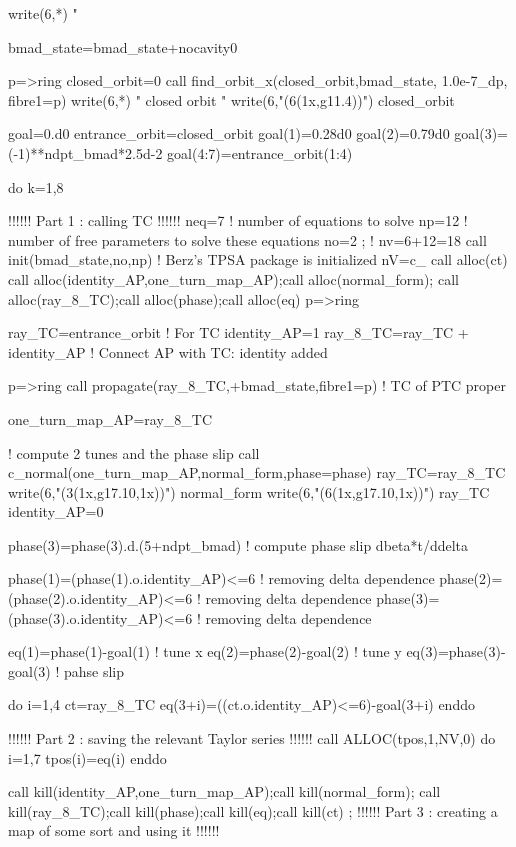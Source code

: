 \documentclass{hitec}     %
\begin{document}
{{\begin{code}
write(6,*) " %

bmad_state=bmad_state+nocavity0

p=>ring%
closed_orbit=0
call find_orbit_x(closed_orbit,bmad_state, 1.0e-7_dp, fibre1=p)
write(6,*) " closed orbit "
write(6,"(6(1x,g11.4))") closed_orbit
 
goal=0.d0
entrance_orbit=closed_orbit
goal(1)=0.28d0
goal(2)=0.79d0
goal(3)=(-1)**ndpt_bmad*2.5d-2
goal(4:7)=entrance_orbit(1:4)

do k=1,8

!!!!!! Part 1 : calling TC !!!!!!
neq=7     ! number of equations to solve
np=12     ! number of free parameters to solve these equations
no=2 ;    ! nv=6+12=18
call init(bmad_state,no,np)   ! Berz's TPSA package is initialized
nV=c_%
call alloc(ct)  
call alloc(identity_AP,one_turn_map_AP);call alloc(normal_form);
call alloc(ray_8_TC);call alloc(phase);call alloc(eq)
p=>ring%
   
ray_TC=entrance_orbit   !  For TC
identity_AP=1
ray_8_TC=ray_TC + identity_AP ! Connect AP with TC: identity added
 
p=>ring%
call propagate(ray_8_TC,+bmad_state,fibre1=p) !  TC of PTC proper
 
one_turn_map_AP=ray_8_TC

! compute 2 tunes and the phase slip
call c_normal(one_turn_map_AP,normal_form,phase=phase) 
ray_TC=ray_8_TC
write(6,"(3(1x,g17.10,1x))") normal_form%
write(6,"(6(1x,g17.10,1x))") ray_TC%
 identity_AP=0

phase(3)=phase(3).d.(5+ndpt_bmad)    ! compute phase slip dbeta*t/ddelta 
 
phase(1)=(phase(1).o.identity_AP)<=6  ! removing delta dependence
phase(2)=(phase(2).o.identity_AP)<=6  ! removing delta dependence
phase(3)=(phase(3).o.identity_AP)<=6  ! removing delta dependence
 

eq(1)=phase(1)-goal(1)  ! tune x
eq(2)=phase(2)-goal(2)  ! tune y
eq(3)=phase(3)-goal(3)  ! pahse slip  
 
do i=1,4
ct=ray_8_TC%
eq(3+i)=((ct.o.identity_AP)<=6)-goal(3+i)
enddo

!!!!!! Part 2 : saving the relevant Taylor series  !!!!!!
   call ALLOC(tpos,1,NV,0)
do i=1,7
 tpos(i)=eq(i)
enddo


call kill(identity_AP,one_turn_map_AP);call kill(normal_form);
call kill(ray_8_TC);call kill(phase);call kill(eq);call kill(ct)  ;
!!!!!! Part 3 : creating a map of some sort and using it !!!!!!


\end{code}}}
\end{document}
